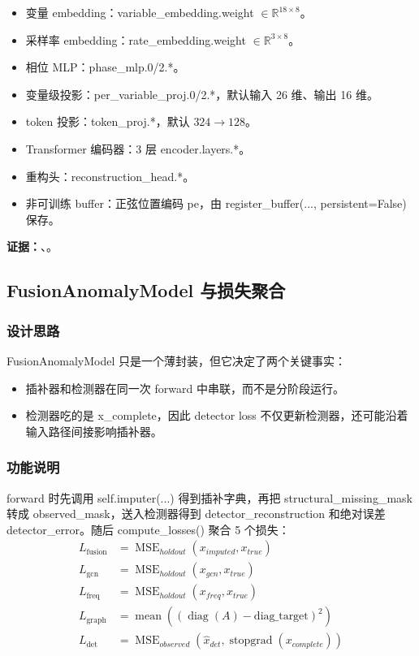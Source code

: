 \documentclass[11pt,a4paper]{ctexart}
\newcommand{\code}[1]{{\ttfamily\small #1}}
\newcommand{\evidence}[1]{\textbf{证据：}#1}
\begin{document}
\begin{itemize}
  \item 变量 embedding：\code{variable\_embedding.weight} $\in \mathbb{R}^{18 \times 8}$。
  \item 采样率 embedding：\code{rate\_embedding.weight} $\in \mathbb{R}^{3 \times 8}$。
  \item 相位 MLP：\code{phase\_mlp.0/2.*}。
  \item 变量级投影：\code{per\_variable\_proj.0/2.*}，默认输入 26 维、输出 16 维。
  \item token 投影：\code{token\_proj.*}，默认 $324 \rightarrow 128$。
  \item Transformer 编码器：3 层 \code{encoder.layers.*}。
  \item 重构头：\code{reconstruction\_head.*}。
  \item 非可训练 buffer：正弦位置编码 \code{pe}，由 \code{register\_buffer(..., persistent=False)} 保存。
\end{itemize}

\evidence{、。}

\subsection{FusionAnomalyModel 与损失聚合}

\subsubsection{设计思路}

\code{FusionAnomalyModel} 只是一个薄封装，但它决定了两个关键事实：
\begin{itemize}
  \item 插补器和检测器在同一次 forward 中串联，而不是分阶段运行。
  \item 检测器吃的是 \code{x\_complete}，因此 detector loss 不仅更新检测器，还可能沿着输入路径间接影响插补器。
\end{itemize}

\subsubsection{功能说明}

forward 时先调用 \code{self.imputer(...)} 得到插补字典，再把 \code{structural\_missing\_mask} 转成 \code{observed\_mask}，送入检测器得到 \code{detector\_reconstruction} 和绝对误差 \code{detector\_error}。随后 \code{compute\_losses()} 聚合 5 个损失：
\begin{align*}
L_{\text{fusion}} &= \operatorname{MSE}_{holdout}(x_{imputed}, x_{true}) \\
L_{\text{gcn}} &= \operatorname{MSE}_{holdout}(x_{gcn}, x_{true}) \\
L_{\text{freq}} &= \operatorname{MSE}_{holdout}(x_{freq}, x_{true}) \\
L_{\text{graph}} &= \operatorname{mean}\left((\operatorname{diag}(A) - \text{diag\_target})^2\right) \\
L_{\text{det}} &= \operatorname{MSE}_{observed}(\hat{x}_{det}, \operatorname{stopgrad}(x_{complete}))
\end{align*}
\end{document}
